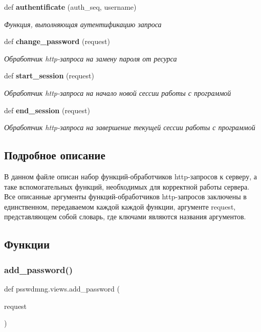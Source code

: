 \begin{DoxyCompactItemize}
def \textbf{ authentificate} (auth\+\_\+seq, username)
\begin{DoxyCompactList}\small\item\em Функция, выполняющая аутентификацию запроса ~\newline
 \end{DoxyCompactList}\item 
def \textbf{ change\+\_\+password} (request)
\begin{DoxyCompactList}\small\item\em Обработчик http-\/запроса на замену пароля от ресурса \end{DoxyCompactList}\item 
def \textbf{ start\+\_\+session} (request)
\begin{DoxyCompactList}\small\item\em Обработчик http-\/запроса на начало новой сессии работы с программой \end{DoxyCompactList}\item 
def \textbf{ end\+\_\+session} (request)
\begin{DoxyCompactList}\small\item\em Обработчик http-\/запроса на завершение текущей сессии работы с программой \end{DoxyCompactList}\end{DoxyCompactItemize}


\subsection{Подробное описание}
\begin{DoxyVerb}В данном файле описан набор функций-обработчиков http-запросов к серверу, а таке вспомогательных функций, необходимых для корректной работы сервера.
Все описанные аргументы функций-обработчиков http-запросов заключены в единственном, передаваемом каждой каждой функции, аргументе request, представляющем
собой словарь, где ключами являются названия аргументов.
\end{DoxyVerb}
 

\subsection{Функции}
\mbox{\label{namespacepsswdmng_1_1views_a7e2a55793835ef1cde007d8d2f6d3520}} 
\subsubsection{add\+\_\+password()}
{\footnotesize\ttfamily def psswdmng.\+views.\+add\+\_\+password (\begin{DoxyParamCaption}\item[{}]{request }\end{DoxyParamCaption})}



